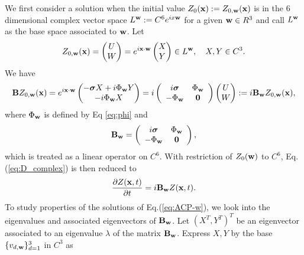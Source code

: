 \documentclass[10pt,reqno]{amsart}
\newcommand{\bS}{\boldsymbol{\sigma}}
\renewcommand{\(}{\left(}
\renewcommand{\)}{\right)}
\newcommand{\bw}{{\bf w}}
\newcommand{\BB}{{\bf B}}
\newcommand{\bx}{\mathbf{x}}
\numberwithin{equation}{section}
\begin{document}
We first consider a solution when the initial value $Z_0(\bx):=Z_{0,\bw}(\bx)$ is in the $6$ dimensional complex vector space $L^{\bw}:=C^6 e^{ix\bw}$ for a given $\bw\in R^3$ and call $L^{\bw}$ as the base space associated to $\bw$.
Let 
\begin{equation}\label{def:Z}
Z_{0,\bw}(\bx)=
\begin{pmatrix}
	U  \\
	W
\end{pmatrix}=e^{i\bx\cdot \bw}\begin{pmatrix}
	X  \\
	Y
\end{pmatrix}
\in L^{\bw}, \quad X,Y \in C^3.
\end{equation}
We have
\begin{equation}\label{eq:eigen_B}
	\BB Z_{0,\bw}(\bx) = e^{i\bx \cdot \bw } \begin{pmatrix}
		-\bS X  + i \Phi_{\bw} Y   \\
		-i \Phi_{\bw}X
	\end{pmatrix} = i \left(
	\begin{array}{cc}
		i\bS & \Phi_{\bw}\\
		-\Phi_{\bw} & \mathbf{0} \\
	\end{array}
	\right)\begin{pmatrix}
		U  \\
		W
	\end{pmatrix} := i \BB_{\bw} Z_{0,\bw}(\bx),
\end{equation}
where $\Phi_{\bw}$ is defined by Eq \ref{eq:phi} and
\[
\BB_{\bw} = \left(
\begin{array}{cc}
	i\bS & \Phi_{\bw}\\
	-\Phi_{\bw} & \mathbf{0} \\
\end{array}
\right),
\]
which is treated as a linear operator on $C^6$.  With restriction of $Z_0(\bw)$ to $C^6$,   Eq. (\ref{eq:D_complex}) is then reduced to 
\begin{equation} \label{eq:ACP-w}
\frac{\partial Z(\bx, t)}{ \partial t} = i \BB_{\bw} Z(\bx, t).  
\end{equation}
To study properties of the solutions of Eq.(\ref{eq:ACP-w}), we look into the eigenvalues and associated eigenvectors of $\BB_{\bw}$. Let $(X^T,Y^T)^T$ be an eigenvector associated to an eigenvalue $\lambda$ of the matrix $\BB_{\bw}$.
Express $X,Y$ by the base $\{v_{d,\bw}\}_{d=1}^3$ in $C^3$ as
\end{document}
